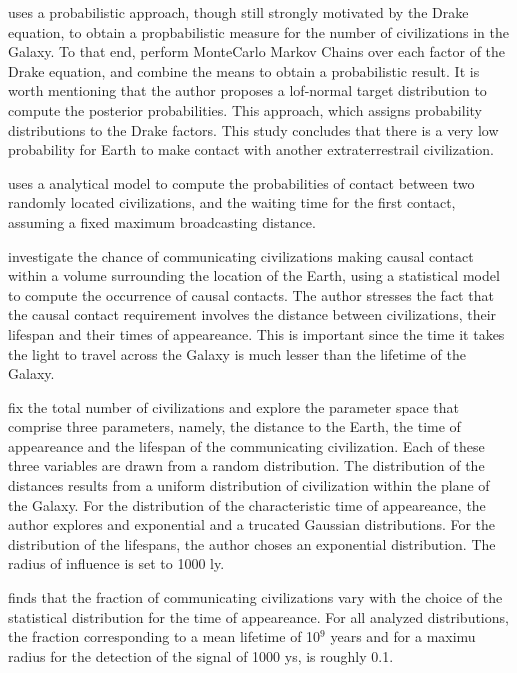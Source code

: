 \documentclass[crop]{CSLB}%
\begin{document}
\citet{bloetscher_using_2019} uses a probabilistic approach, though
still strongly motivated by the Drake equation, to obtain a
propbabilistic measure for the number of civilizations in the Galaxy.
To that end, perform MonteCarlo Markov Chains over each factor of the
Drake equation, and combine the means to obtain a probabilistic
result. It is worth mentioning that the author proposes a lof-normal
target distribution to compute the posterior probabilities. This
approach, which assigns probability distributions to the Drake
factors. This study concludes that there is a very low probability for
Earth to make contact with another extraterrestrail civilization.    

\citet{smith_broadcasting_2009} uses a analytical model to compute the
probabilities of contact between two randomly located civilizations,
and the waiting time for the first contact, assuming a fixed maximum
broadcasting distance.
 
\citet{balbi_impact_2018} investigate the chance of communicating
civilizations making causal contact within a volume surrounding the
location of the Earth, using a statistical model to compute the
occurrence of causal contacts. The author stresses the fact that the
causal contact requirement involves the distance between
civilizations, their lifespan and their times of appeareance.  This is
important since the time it takes the light to travel across the
Galaxy is much lesser than the lifetime of the Galaxy.

\citet{balbi_impact_2018} fix the total number of civilizations and
explore the parameter space that comprise three parameters, namely,
the distance to the Earth, the time of appeareance and the lifespan of
the communicating civilization. Each of these three variables are
drawn from a random distribution. The distribution of the distances
results from a uniform distribution of civilization within the plane
of the Galaxy. For the distribution of the characteristic time of
appeareance, the author explores and exponential and a trucated
Gaussian distributions. For the distribution of the lifespans, the
author choses an exponential distribution. The radius of influence is
set to 1000 ly.

\citet{balbi_impact_2018} finds that the fraction of communicating
civilizations vary with the choice of the statistical distribution for
the time of appeareance. For all analyzed distributions, the fraction
corresponding to a mean lifetime of 10$^9$ years and for a maximu
radius for the detection of the signal of 1000 ys, is roughly 0.1.
\end{document}
